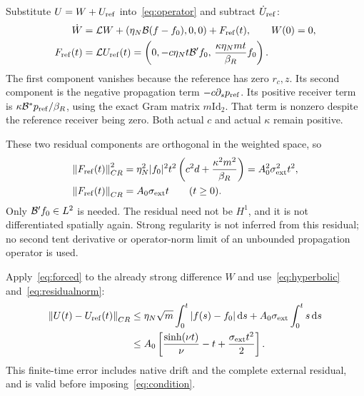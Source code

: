 Substitute $U=W+U_{\rm ref}$ into~\eqref{eq:operator} and subtract $\dot U_{\rm ref}$:
\begin{equation}\label{eq:residual}%
\begin{aligned}
\dot W&=\LL W+(\eta_N\B(f-f_0),0,0)+F_{\rm ref}(t),\qquad W(0)=0,\\
F_{\rm ref}(t)&=\LL U_{\rm ref}(t)
=\left(0,-c\eta_Nt\B'f_0,\,
\frac{\kappa\eta_Nmt}{\beta_R}f_0\right).
\end{aligned}
\end{equation}
The first component vanishes because the reference has zero $r_c,z$. Its second component is the negative propagation term $-c\partial_sp_{\rm ref}$. Its positive receiver term is $\kappa\mathcal B^*p_{\rm ref}/\beta_R$, using the exact Gram matrix $m\mathrm{Id}_2$. That term is nonzero despite the reference receiver being zero. Both actual $c$ and actual $\kappa$ remain positive.

These two residual components are orthogonal in the weighted space, so
\begin{equation}\label{eq:residualnorm}%
\begin{aligned}
\norm{F_{\rm ref}(t)}_{CR}^2
&=\eta_N^2|f_0|^2t^2
\left(c^2d+\frac{\kappa^2m^2}{\beta_R}\right)
=A_0^2\sigma_{\rm ext}^2t^2,\\
\norm{F_{\rm ref}(t)}_{CR}&=A_0\sigma_{\rm ext}t\qquad(t\ge0).
\end{aligned}
\end{equation}
Only $\mathcal B'f_0\in L^2$ is needed. The residual need not be $H^1$, and it is not differentiated spatially again. Strong regularity is not inferred from this residual; no second tent derivative or operator-norm limit of an unbounded propagation operator is used.

Apply~\eqref{eq:forced} to the already strong difference $W$ and use~\eqref{eq:hyperbolic} and~\eqref{eq:residualnorm}:
\begin{equation}\label{eq:error}%
\begin{aligned}
\norm{U(t)-U_{\rm ref}(t)}_{CR}
&\le\eta_N\sqrt m\int_0^t|f(s)-f_0|\dd s
+A_0\sigma_{\rm ext}\int_0^ts\dd s\\
&\le A_0\left[\frac{\sinh(\nu t)}{\nu}-t+
\frac{\sigma_{\rm ext}t^2}{2}\right].
\end{aligned}
\end{equation}
This finite-time error includes native drift and the complete external residual, and is valid before imposing~\eqref{eq:condition}.

